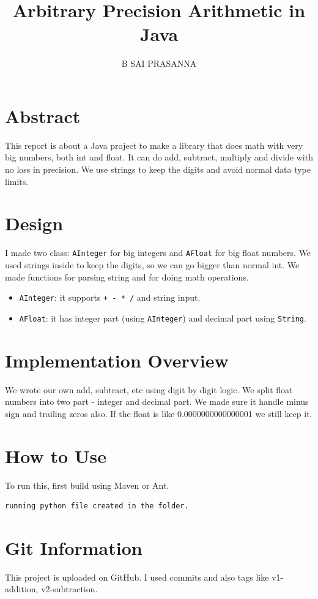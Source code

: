 \documentclass[12pt]{article}
\title{Arbitrary Precision Arithmetic in Java}
\author{B SAI PRASANNA}
\date{}
\begin{document}
\maketitle

\section*{Abstract}
This report is about a Java project to make a library that does math with very big numbers, both int and float. It can do add, subtract, multiply and divide with no loss in precision. We use strings to keep the digits and avoid normal data type limits.

\section*{Design}
I made two class: \texttt{AInteger} for big integers and \texttt{AFloat} for big float numbers. We used strings inside to keep the digits, so we can go bigger than normal int. We made functions for parsing string and for doing math operations.

\begin{itemize}
\item \texttt{AInteger}: it supports \texttt{+ - * /} and string input.
\item \texttt{AFloat}: it has integer part (using \texttt{AInteger}) and decimal part using \texttt{String}.
\end{itemize}

\section*{Implementation Overview}
We wrote our own add, subtract, etc using digit by digit logic. We split float numbers into two part - integer and decimal part. We made sure it handle minus sign and trailing zeros also. If the float is like 0.0000000000000001 we still keep it.

\section*{How to Use}
To run this, first build using Maven or Ant.

\begin{verbatim}
running python file created in the folder.
\end{verbatim}


\section*{Git Information}
This project is uploaded on GitHub. I used commits and also tags like v1-addition, v2-subtraction.
\end{document}
